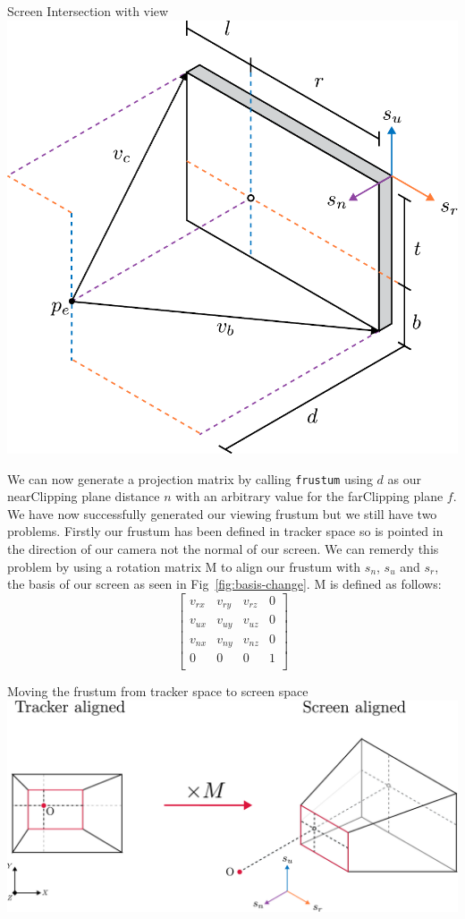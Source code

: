 \begin{figureBox}[label={fig:screen-extents}]{Screen Intersection with view}
\includegraphics[width = 0.5\linewidth]{./figures/background/projection/eye-projection.pdf}
\end{figureBox}

We can now generate a projection matrix by calling \texttt{frustum} using $d$ as our nearClipping plane distance $n$ with an arbitrary value for the farClipping plane $f$. We have now successfully generated our viewing frustum but we still have two problems. Firstly our frustum has been defined in tracker space so is pointed in the direction of our camera not the normal of our screen. We can remerdy this problem by using a rotation matrix M to align our frustum with $s_n$, $s_u$ and $s_r$, the basis of our screen as seen in Fig~\ref{fig:basis-change}. M is defined as follows: 
\[ 
\begin{bmatrix}
v_{rx} & v_{ry} & v_{rz} & 0 \\
v_{ux} & v_{uy} & v_{uz} & 0 \\
v_{nx} & v_{ny} & v_{nz}& 0 \\
0 & 0 & 0 & 1 \\
\end{bmatrix}
\]

\begin{figureBox}[label={fig:basis-change}]{Moving the frustum from tracker space to screen space}
\includegraphics[width = 0.8\linewidth]{./figures/background/projection/realignment.pdf}
\end{figureBox}

